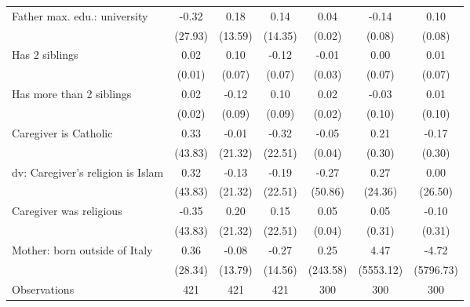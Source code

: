 {\begin{tabular}{l*{6}{c}}
\addlinespace
Father max. edu.: university&       -0.32         &        0.18         &        0.14         &        0.04         &       -0.14         &        0.10         \\
                    &     (27.93)         &     (13.59)         &     (14.35)         &      (0.02)         &      (0.08)         &      (0.08)         \\
\addlinespace
Has 2 siblings      &        0.02         &        0.10         &       -0.12         &       -0.01         &        0.00         &        0.01         \\
                    &      (0.01)         &      (0.07)         &      (0.07)         &      (0.03)         &      (0.07)         &      (0.07)         \\
\addlinespace
Has more than 2 siblings&        0.02         &       -0.12         &        0.10         &        0.02         &       -0.03         &        0.01         \\
                    &      (0.02)         &      (0.09)         &      (0.09)         &      (0.02)         &      (0.10)         &      (0.10)         \\
\addlinespace
Caregiver is Catholic&        0.33         &       -0.01         &       -0.32         &       -0.05         &        0.21         &       -0.17         \\
                    &     (43.83)         &     (21.32)         &     (22.51)         &      (0.04)         &      (0.30)         &      (0.30)         \\
\addlinespace
dv: Caregiver's religion is Islam&        0.32         &       -0.13         &       -0.19         &       -0.27         &        0.27         &        0.00         \\
                    &     (43.83)         &     (21.32)         &     (22.51)         &     (50.86)         &     (24.36)         &     (26.50)         \\
\addlinespace
Caregiver was religious&       -0.35         &        0.20         &        0.15         &        0.05         &        0.05         &       -0.10         \\
                    &     (43.83)         &     (21.32)         &     (22.51)         &      (0.04)         &      (0.31)         &      (0.31)         \\
\addlinespace
Mother: born outside of Italy&        0.36         &       -0.08         &       -0.27         &        0.25         &        4.47         &       -4.72         \\
                    &     (28.34)         &     (13.79)         &     (14.56)         &    (243.58)         &   (5553.12)         &   (5796.73)         \\
\midrule
Observations        &         421         &         421         &         421         &         300         &         300         &         300         \\
\bottomrule
\end{tabular}
}
